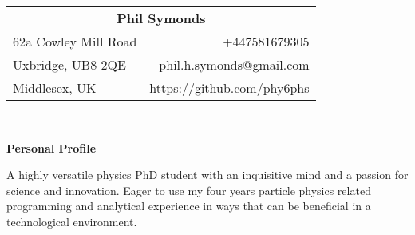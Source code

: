 \documentclass[letterpaper,11pt]{article}
\newcommand{\resheading}[1]{{\large
\colorbox{mygrey}{\begin{minipage}{\textwidth}{\textbf{#1
\vphantom{p\^{E}}}}\end{minipage}}}\vspace{6pt}}
\begin{document}
\newcommand{\infoheader}{
\begin{tabular*}{7.5in}{l@{\extracolsep{\fill}}r}
 \multicolumn{2}{c}{\textbf{\Huge Phil Symonds}}  \vspace{12pt}\\

62a Cowley Mill Road             & +447581679305\\
Uxbridge, UB8 2QE               & phil.h.symonds@gmail.com\\
Middlesex, UK                   & https://github.com/phy6phs\\
\end{tabular*}
\\

\vspace{0.1in}
}

\newcommand{\pagebreakwithheader}{\pagebreak\infoheader}

\infoheader
% 
\resheading{Personal Profile}
A highly versatile physics PhD student with an inquisitive mind and a passion for science and 
innovation. Eager to use my four years particle physics related programming and analytical experience in ways that can be beneficial in a technological environment.



\vspace{6pt}
\end{document}
